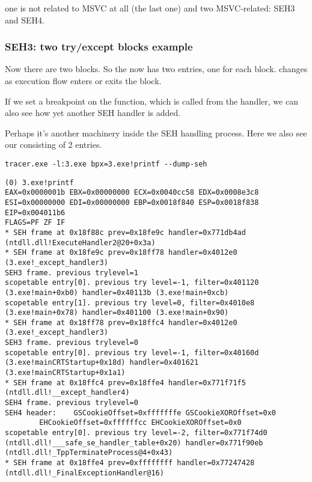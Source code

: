 one is not related to MSVC at all (the last one) and two MSVC-related: SEH3 and SEH4.

\subsubsection{SEH3: two try/except blocks example}



Now there are two  blocks.
So the  now has two entries, one for each block.
 changes as execution flow enters or exits the  block.



If we set a breakpoint on the \printf{} function, which is called from the handler, 
we can also see how yet another SEH handler is added.

Perhaps it's another machinery inside the SEH handling process.
Here we also see our  consisting of 2 entries.

\begin{lstlisting}
tracer.exe -l:3.exe bpx=3.exe!printf --dump-seh
\end{lstlisting}

\begin{lstlisting}[caption=tracer.exe output]
(0) 3.exe!printf
EAX=0x0000001b EBX=0x00000000 ECX=0x0040cc58 EDX=0x0008e3c8
ESI=0x00000000 EDI=0x00000000 EBP=0x0018f840 ESP=0x0018f838
EIP=0x004011b6
FLAGS=PF ZF IF
* SEH frame at 0x18f88c prev=0x18fe9c handler=0x771db4ad (ntdll.dll!ExecuteHandler2@20+0x3a)
* SEH frame at 0x18fe9c prev=0x18ff78 handler=0x4012e0 (3.exe!_except_handler3)
SEH3 frame. previous trylevel=1
scopetable entry[0]. previous try level=-1, filter=0x401120 (3.exe!main+0xb0) handler=0x40113b (3.exe!main+0xcb)
scopetable entry[1]. previous try level=0, filter=0x4010e8 (3.exe!main+0x78) handler=0x401100 (3.exe!main+0x90)
* SEH frame at 0x18ff78 prev=0x18ffc4 handler=0x4012e0 (3.exe!_except_handler3)
SEH3 frame. previous trylevel=0
scopetable entry[0]. previous try level=-1, filter=0x40160d (3.exe!mainCRTStartup+0x18d) handler=0x401621 (3.exe!mainCRTStartup+0x1a1)
* SEH frame at 0x18ffc4 prev=0x18ffe4 handler=0x771f71f5 (ntdll.dll!__except_handler4)
SEH4 frame. previous trylevel=0
SEH4 header:	GSCookieOffset=0xfffffffe GSCookieXOROffset=0x0
		EHCookieOffset=0xffffffcc EHCookieXOROffset=0x0
scopetable entry[0]. previous try level=-2, filter=0x771f74d0 (ntdll.dll!___safe_se_handler_table+0x20) handler=0x771f90eb (ntdll.dll!_TppTerminateProcess@4+0x43)
* SEH frame at 0x18ffe4 prev=0xffffffff handler=0x77247428 (ntdll.dll!_FinalExceptionHandler@16)
\end{lstlisting}

